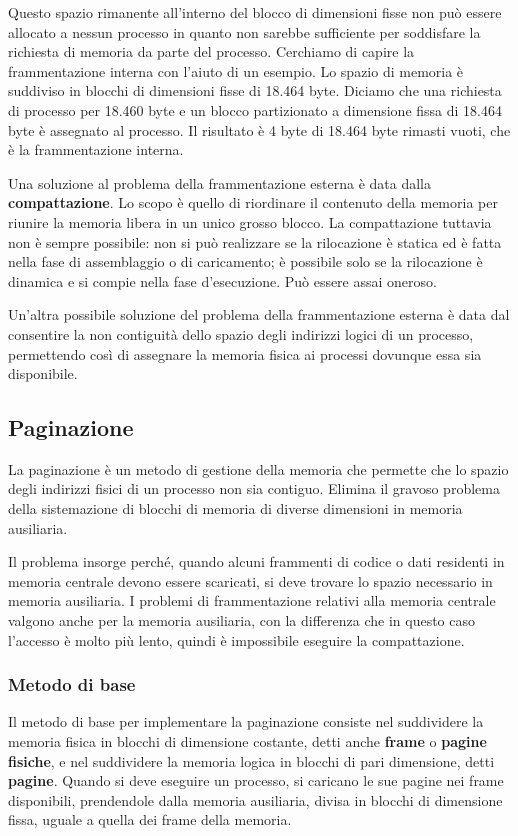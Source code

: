 \documentclass[11pt,a4paper]{article}
\begin{document}
Questo spazio rimanente all'interno del blocco di dimensioni fisse non può essere allocato a nessun processo in quanto non sarebbe sufficiente per soddisfare la richiesta di memoria da parte del processo. Cerchiamo di capire la frammentazione interna con l'aiuto di un esempio. Lo spazio di memoria è suddiviso in blocchi di dimensioni fisse di 18.464 byte. Diciamo che una richiesta di processo per 18.460 byte e un blocco partizionato a dimensione fissa di 18.464 byte è assegnato al processo. Il risultato è 4 byte di 18.464 byte rimasti vuoti, che è la frammentazione interna.

Una soluzione al problema della frammentazione esterna è data dalla \textbf{compattazione}.
Lo scopo è quello di riordinare il contenuto della memoria per riunire la memoria libera in
un unico grosso blocco. La compattazione tuttavia non è sempre possibile: non si può rea­lizzare se la rilocazione è statica ed è fatta nella fase di assemblaggio o di caricamento; è pos­sibile solo se la rilocazione è dinamica e si compie nella fase d'esecuzione. Può essere assai oneroso.

Un'altra possibile soluzione del problema della frammentazione esterna è data dal con­sentire la non contiguità dello spazio degli indirizzi logici di un processo, permettendo così
di assegnare la memoria fisica ai processi dovunque essa sia disponibile.

\subsection{Paginazione}
La paginazione è un metodo di gestione della memoria che permette che lo spazio degli in­dirizzi fisici di un processo non sia contiguo. Elimina il gravoso problema della sistemazio­ne di blocchi di memoria di diverse dimensioni in memoria ausiliaria.

Il problema insor­ge perché, quando alcuni frammenti di codice o dati residenti in memoria centrale devono
essere scaricati, si deve trovare lo spazio necessario in memoria ausiliaria. I problemi di fram­mentazione relativi alla memoria centrale valgono anche per la memoria ausiliaria, con la
differenza che in questo caso l'accesso è molto più lento, quindi è impossibile eseguire la
compattazione.

\subsubsection{Metodo di base}
Il metodo di base per implementare la paginazione consiste nel suddividere la memoria fisi­ca in blocchi di dimensione costante, detti anche \textbf{frame} o \textbf{pagine fisiche}, e nel suddividere
la memoria logica in blocchi di pari dimensione, detti \textbf{pagine}. Quando si deve eseguire un
processo, si caricano le sue pagine nei frame disponibili, prendendole dalla memoria ausilia­ria, divisa in blocchi di dimensione fissa, uguale a quella dei frame della memoria.
\end{document}
